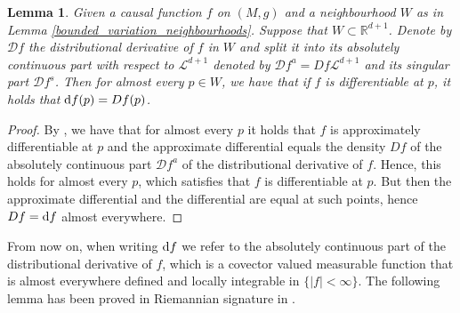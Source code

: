 \documentclass[a4paper,10pt]{article}
\newtheorem{lemma}[theorem]{Lemma}
\numberwithin{equation}{section}
\newcommand{\R}{\mathbb{R}}
\newcommand{\di}{{\rm d}}
\begin{document}
\begin{lemma}\label{identify_derivative_with_absolutely_continuous_part}
    Given a causal function $f$ on $(M, g)$ and a neighbourhood $W$ as in Lemma \ref{bounded_variation_neighbourhoods}. Suppose that $W \subset\R^{d+1}$. Denote by $\mathcal{D}f$ the distributional derivative of $f$ in $W$ and split it into its absolutely continuous part with respect to $\mathcal{L}^{d+1}$ denoted by $\mathcal{D}f^a = Df \mathcal{L}^{d+1}$ and its singular part $\mathcal{D}f^s$. Then for almost every $p \in W$, we have that if $f$ is differentiable at $p$, it holds that $\di f(p) = Df(p)$.
\end{lemma}
\begin{proof}
    By \cite[Theorem 3.83]{ambrosio2000functions}, we have that for almost every $p$ it holds that $f$ is approximately differentiable at $p$ and the approximate differential equals the density $Df$ of the absolutely continuous part $\mathcal{D}f^a$ of the distributional derivative of $f$. Hence, this holds for almost every $p$, which satisfies that $f$ is differentiable at $p$. But then the approximate differential and the differential are equal at such points, hence $Df = \di f$ almost everywhere.
\end{proof}

From now on, when writing $\di f$ we refer to the absolutely continuous part of the distributional derivative of $f$, which is a covector valued measurable function that is almost everywhere defined and locally integrable in $\{|f| < \infty\}$. 
The following lemma has been proved in Riemannian signature in \cite{mondino2025equivalence}.
\end{document}
